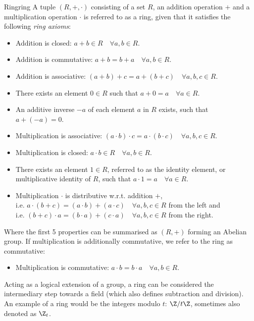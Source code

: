 \begin{definition}{Ring}{ring}
  A tuple $(R, +, \cdot)$ consisting of a set $R$, an addition operation $+$ and a multiplication operation $\cdot$
  is referred to as a ring, given that it satisfies the following \textit{ring axioms}:
  \begin{itemize}
    \item Addition is closed: $a + b \in R \quad\forall a, b \in R$.
    \item Addition is commutative: $a + b = b + a \quad\forall a, b \in R$.
    \item Addition is associative: $(a + b) + c = a + (b + c) \quad\forall a, b, c \in R$.
    \item There exists an element $0 \in R$ such that $a + 0 = a \quad\forall a \in R$.
    \item An additive inverse $-a$ of each element $a$ in $R$ exists, such that $a + (-a) = 0$.
    \item Multiplication is associative: $(a \cdot b) \cdot c = a \cdot (b \cdot c) \quad\forall a, b, c \in R$.
    \item Multiplication is closed: $a \cdot b \in R \quad\forall a, b \in R$.
    \item There exists an element $1 \in R$, referred to as the identity element, or multiplicative identity of $R$,
          such that $a \cdot 1 = a \quad\forall a \in R$.
    \item Multiplication $\cdot$ is distributive w.r.t. addition $+$, \\
          i.e. $a \cdot (b+c) = (a \cdot b) + (a \cdot c) \quad\forall a, b, c \in R$ from the left and \\
          i.e. $(b+c) \cdot a = (b \cdot a) + (c \cdot a) \quad\forall a, b, c \in R$ from the right.
  \end{itemize}
  Where the first 5 properties can be summarised as $(R, +)$ forming an Abelian group.
  If multiplication is additionally commutative, we refer to the ring as commutative:
  \begin{itemize}
    \item Multiplication is commutative: $a \cdot b = b \cdot a \quad\forall a, b \in R$.
  \end{itemize}
\end{definition}
Acting as a logical extension of a group, a ring can be considered the intermediary step towards a field
(which also defines subtraction and division).
An example of a ring would be the integers modulo $t$: $\Z / t \Z$, sometimes also denoted as $\Z_t$.

